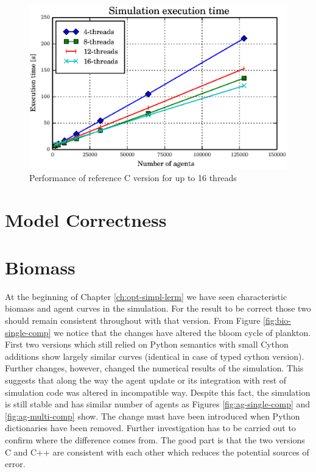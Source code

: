 \documentclass[12pt, a4paper]{report}
\begin{document}
\begin{figure}[H]
  \begin{center}
    \includegraphics[width=\columnwidth]{graphs/master-perf-multi-16.eps}
    \caption{Performance of reference C version for up to 16 threads}
    \label{fig:master-perf-multi-16}
  \end{center}
\end{figure}

\section{Model Correctness}\label{sec:model-correct}

\section{Biomass}\label{subsec:model-correct-bio}
At the beginning of Chapter \ref{ch:opt-simpl-lerm} we have seen characteristic
biomass and agent curves in the simulation. For the result to be correct
those two should remain consistent throughout with that version. From Figure
\ref{fig:bio-single-comp} we notice that the changes have altered the bloom
cycle of plankton. First two versions which still relied on Python semantics
with small Cython additions show largely similar curves (identical in case
of typed cython version). Further changes, however, changed the numerical results
of the simulation. This suggests that along the way the agent update or its
integration with rest of simulation code was altered in incompatible way.
Despite this fact, the simulation is still stable and has similar number of
agents as Figures \ref{fig:ag-single-comp} and \ref{fig:ag-multi-comp} show.
The change must have been introduced when Python dictionaries have been
removed. Further investigation has to be carried out to confirm where the difference
comes from. The good part is that the two versions C and C++ are consistent with
each other which reduces the potential sources of error.
\end{document}
